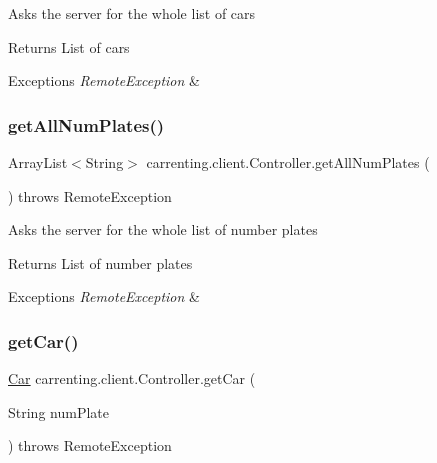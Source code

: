 Asks the server for the whole list of cars

\begin{DoxyReturn}{Returns}
List of cars 
\end{DoxyReturn}

\begin{DoxyExceptions}{Exceptions}
{\em Remote\+Exception} & \\
\hline
\end{DoxyExceptions}
\mbox{\label{classcarrenting_1_1client_1_1_controller_a2a1f2139f9682b3c1215798216bee256}} 
\subsubsection{\texorpdfstring{getAllNumPlates()}{getAllNumPlates()}}
{\footnotesize\ttfamily Array\+List$<$String$>$ carrenting.\+client.\+Controller.\+get\+All\+Num\+Plates (\begin{DoxyParamCaption}{ }\end{DoxyParamCaption}) throws Remote\+Exception}

Asks the server for the whole list of number plates

\begin{DoxyReturn}{Returns}
List of number plates 
\end{DoxyReturn}

\begin{DoxyExceptions}{Exceptions}
{\em Remote\+Exception} & \\
\hline
\end{DoxyExceptions}
\mbox{\label{classcarrenting_1_1client_1_1_controller_ae306f94b15ad4b3869d13ce8f6c46d45}} 
\subsubsection{\texorpdfstring{getCar()}{getCar()}}
{\footnotesize\ttfamily \mbox{\hyperlink{classcarrenting_1_1server_1_1jdo_1_1_car}{Car}} carrenting.\+client.\+Controller.\+get\+Car (\begin{DoxyParamCaption}\item[{String}]{num\+Plate }\end{DoxyParamCaption}) throws Remote\+Exception}

